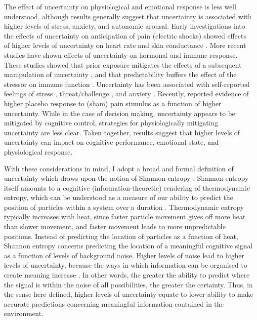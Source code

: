 \begin{CJK}{UTF8}{gbsn}
The effect of uncertainty on physiological and emotional response is less well understood, although results generally suggest that uncertainty is associated with higher levels of stress, anxiety, and autonomic arousal.  Early investigations into the effects of uncertainty on anticipation of pain (electric shocks) showed effects of higher levels of uncertainty on heart rate \citep{Averill1972} and skin conductance \citep{Epstein1970}. More recent studies have shown effects of uncertainty on hormonal \citep[e.g., serum cortisol, see][]{Voigt1990} and immune \citep[e.g., lymphocyte proliferation, see ][]{Zakowski1995} response. These studies showed that prior exposure mitigates the effects of a subsequent manipulation of uncertainty \citep{Voigt1990}, and that predictability buffers the effect of the stressor on immune function \citep{Zakowski1995}.  Uncertainty has been associated with self-reported feelings of stress \citep{Lazarus1985}, threat/challenge \citep{Folkman1985}, and anxiety \citep{Holaway2006}.  Recently, \textcite{Moutoussis2014} reported evidence of higher placebo response to (sham) pain stimulus as a function of higher uncertainty.  While in the case of decision making, uncertainty appears to be mitigated by cognitive control, strategies for physiologically mitigating uncertainty are less clear. Taken together, results suggest that higher levels of uncertainty can impact on cognitive performance, emotional state, and physiological response.

With these considerations in mind, I adopt a broad and formal definition of uncertainty which draws upon the notion of Shannon entropy \citep{Shannon1963}.  Shannon entropy itself amounts to a cognitive (information-theoretic) rendering of thermodynamic entropy, which can be understood as a measure of our ability to predict the position of particles within a system over a duration \citep{Linson2018}. Thermodynamic entropy typically increases with heat, since faster particle movement gives off more heat than slower movement, and faster movement leads to more unpredictable positions.  Instead of predicting the location of particles as a function of heat, Shannon entropy concerns predicting the location of a meaningful cognitive signal as a function of levels of background noise.  Higher levels of noise lead to higher levels of uncertainty, because the ways in which information can be organised to create meaning increase \citep{Shannon1963}. In other words, the greater the ability to predict where the signal is within the noise of all possibilities, the greater the certainty.  Thus, in the sense here defined, higher levels of uncertainty equate to lower ability to make accurate predictions concerning meaningful information contained in the environment.



\end{CJK}
